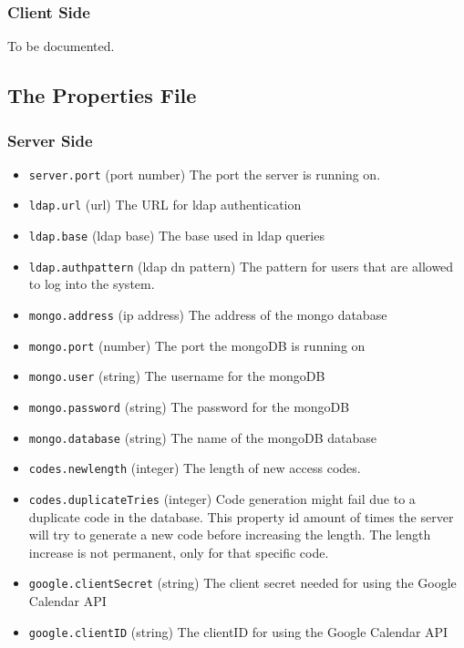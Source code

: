 \subsubsection{Client Side}
To be documented.

\subsection{The Properties File}
\subsubsection{Server Side}
\begin{itemize}
\item \verb!server.port! (port number) The port the server is running on.
\item \verb!ldap.url! (url) The URL for ldap authentication
\item \verb!ldap.base! (ldap base) The base used in ldap queries
\item \verb!ldap.authpattern! (ldap dn pattern) The pattern for users that are allowed to log into the system. 
\item \verb!mongo.address! (ip address) The address of the mongo database
\item \verb!mongo.port! (number) The port the mongoDB is running on
\item \verb!mongo.user! (string) The username for the mongoDB
\item \verb!mongo.password! (string) The password for the mongoDB
\item \verb!mongo.database! (string) The name of the mongoDB database

\item \verb!codes.newlength! (integer) The length of new access codes.
\item \verb!codes.duplicateTries! (integer) Code generation might fail due to a duplicate code in the database. This property id amount of times the server will try to generate a new code before increasing the length. The length increase is not permanent, only for that specific code.

\item \verb!google.clientSecret! (string) The client secret needed for using the Google Calendar API
\item \verb!google.clientID! (string) The clientID for using the Google Calendar API


\end{itemize}
